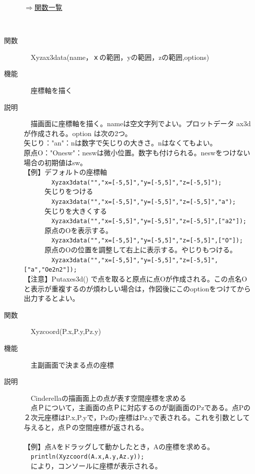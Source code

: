 \documentclass[papersize,a4paper,12pt,uplatex]{jsarticle}
\begin{document}
\begin{description}
\begin{flushright} \hyperlink{functionlist3d}{$\Rightarrow$関数一覧}\end{flushright}
　\\
\hypertarget{xyzax3data}{}
\item[関数]　Xyzax3data(name，ｘの範囲，yの範囲，zの範囲,options)
\item[機能]　座標軸を描く
\item[説明]　描画面に座標軸を描く。nameは空文字列でよい。プロットデータ ax3d  が作成される。option は次の2つ。\\
矢じり："an"：nは数字で矢じりの大きさ。nはなくてもよい。\\
原点O："Onesw"：neswは微小位置。数字も付けられる。neswをつけない場合の初期値はsw。\\
【例】デフォルトの座標軸\\
　　　　\verb|Xyzax3data("","x=[-5,5]","y=[-5,5]","z=[-5,5]");|\\
　　　矢じりをつける\\
　　　　\verb|Xyzax3data("","x=[-5,5]","y=[-5,5]","z=[-5,5]","a");|\\
　　　矢じりを大きくする\\
　　　　\verb|Xyzax3data("","x=[-5,5]","y=[-5,5]","z=[-5,5]",["a2"]);|\\
　　　原点のOを表示する。\\
　　　　\verb|Xyzax3data("","x=[-5,5]","y=[-5,5]","z=[-5,5]",["O"]);|\\
　　　原点のOの位置を調整して右上に表示する。やじりもつける。\\
　　　　\verb|Xyzax3data("","x=[-5,5]","y=[-5,5]","z=[-5,5]",["a","Oe2n2"]);|\\

【注意】Putaxes3d() で点を取ると原点に点Oが作成される。この点名Oと表示が重複するのが煩わしい場合は，作図後にこのoptionをつけてから出力するとよい。\\


\hypertarget{xyzcoord}{}
\item[関数]　Xyzcoord(P.x,P.y,Pz.y)
\item[機能]　主副画面で決まる点の座標
\item[説明]　Cinderellaの描画面上の点が表す空間座標を求める\\
　点Ｐについて，主画面の点Ｐに対応するのが副画面のPzである。点Pの２次元座標はP.x,P.yで，Pzのy座標はPz.yで表される。これを引数として与えると，点Ｐの空間座標が返される。\\
　\\
【例】点Aをドラッグして動かしたとき，Aの座標を求める。\\
　\verb|println(Xyzcoord(A.x,A.y,Az.y));|\\
　により，コンソールに座標が表示される。\\

\end{description}
\newpage
\end{document}
